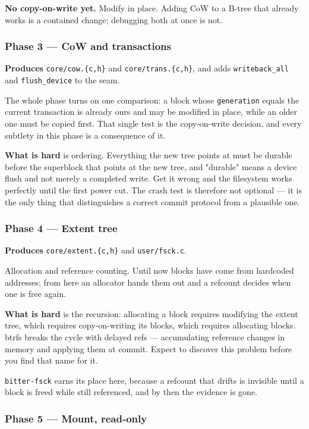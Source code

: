 \textbf{No copy-on-write yet.} Modify in place. Adding CoW to a B-tree that
already works is a contained change; debugging both at once is not.

\subsubsection{Phase 3 --- CoW and transactions}

\textbf{Produces} \texttt{core/cow.\{c,h\}} and \texttt{core/trans.\{c,h\}}, and
adds \texttt{writeback\_all} and \texttt{flush\_device} to the seam.

The whole phase turns on one comparison: a block whose \texttt{generation}
equals the current transaction is already ours and may be modified in place,
while an older one must be copied first. That single test is the copy-on-write
decision, and every subtlety in this phase is a consequence of it.

\textbf{What is hard} is ordering. Everything the new tree points at must be
durable before the superblock that points at the new tree, and "durable" means
a device flush and not merely a completed write. Get it wrong and the
filesystem works perfectly until the first power cut. The crash test is
therefore not optional --- it is the only thing that distinguishes a correct
commit protocol from a plausible one.

\subsubsection{Phase 4 --- Extent tree}

\textbf{Produces} \texttt{core/extent.\{c,h\}} and \texttt{user/fsck.c}.

Allocation and reference counting. Until now blocks have come from hardcoded
addresses; from here an allocator hands them out and a refcount decides when
one is free again.

\textbf{What is hard} is the recursion: allocating a block requires modifying
the extent tree, which requires copy-on-writing its blocks, which requires
allocating blocks. btrfs breaks the cycle with delayed refs --- accumulating
reference changes in memory and applying them at commit. Expect to discover
this problem before you find that name for it.

\texttt{bitter-fsck} earns its place here, because a refcount that drifts is
invisible until a block is freed while still referenced, and by then the
evidence is gone.

\subsubsection{Phase 5 --- Mount, read-only}

